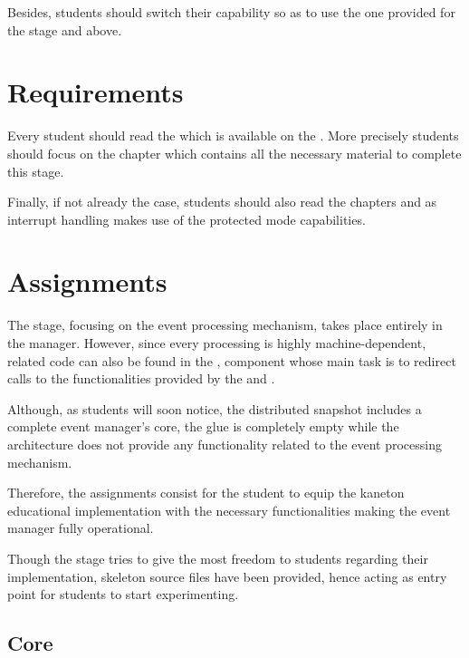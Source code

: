 Besides, students should switch their capability so as to use the one provided
for the stage  and above.

%
%

\section{Requirements}

Every student should read the  which
is available on the . More precisely students should focus
on the chapter  which contains
all the necessary material to complete this stage.

Finally, if not already the case, students should also read the chapters
 and  as interrupt
handling makes use of the protected mode capabilities.

%
%

\section{Assignments}

The  stage, focusing on the event processing mechanism, takes place
entirely in the  manager. However, since every processing is
highly machine-dependent, related code can also be found in the ,
component whose main task is to redirect calls to the functionalities provided
by the  and .

Although, as students will soon notice, the distributed snapshot includes a
complete event manager's core, the glue is completely empty while the
architecture does not provide any functionality related to the event
processing mechanism.

Therefore, the  assignments consist for the student to equip the
kaneton educational implementation with the necessary functionalities making
the event manager fully operational.

Though the stage tries to give the most freedom to students regarding their
implementation, skeleton source files have been provided, hence acting
as entry point for students to start experimenting.

\subsection{Core}

